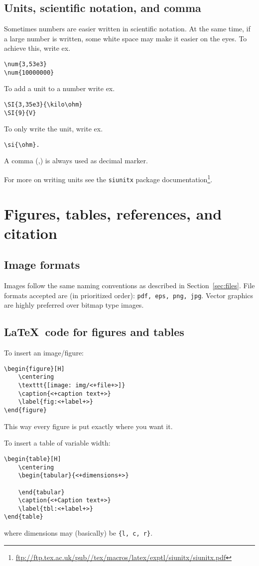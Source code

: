 \subsection{Units, scientific notation, and comma}
Sometimes numbers are easier written in scientific notation. At the same time, if a large number is written, some white space may make it easier on the eyes. To achieve this, write ex.
\begin{verbatim}
\num{3,53e3} 
\num{10000000}
\end{verbatim}
To add a unit to a number write ex.
\begin{verbatim}
\SI{3,35e3}{\kilo\ohm}
\SI{9}{V}
\end{verbatim}
To only write the unit, write ex.
\begin{verbatim}
\si{\ohm}. 
\end{verbatim}
A comma (,) is always used as decimal marker.


For more on writing units see the \texttt{siunitx} package documentation\footnote{\url{ftp://ftp.tex.ac.uk/pub//tex/macros/latex/exptl/siunitx/siunitx.pdf}}.


\section{Figures, tables, references, and citation}
\label{sec:figtabref}
\subsection{Image formats}
Images follow the same naming conventions as described in Section~\ref{sec:files}. File formats accepted are (in prioritized order): \texttt{pdf, eps, png, jpg}. Vector graphics are highly preferred over bitmap type images.


\subsection{\LaTeX\ code for figures and tables}
To insert an image\slash figure:
\begin{verbatim}
\begin{figure}[H]
    \centering
    \texttt{[image: img/<+file+>]}
    \caption{<+caption text+>}
    \label{fig:<+label+>}
\end{figure}
\end{verbatim}
This way every figure is put exactly where you want it.


To insert a table of variable width:
\begin{verbatim}
\begin{table}[H]
    \centering
    \begin{tabular}{<+dimensions+>}

    \end{tabular}
    \caption{<+Caption text+>}
    \label{tbl:<+label+>}
\end{table}
\end{verbatim}
where dimensions may (basically) be \texttt{\{l, c, r\}}.


